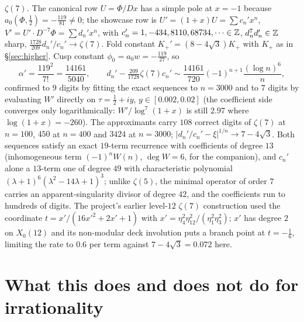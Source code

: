 \documentclass[11pt]{amsart}
\theoremstyle{definition}
\theoremstyle{remark}
\begin{document}
\emph{$\zeta(7)$.} The canonical row $U=\Phi/Dx$ has a simple pole at $x=-1$ because $a_0(\Phi,\tfrac12)=-\tfrac{119}{81}\ne0$; the showcase row is $U'=(1+x)U=\sum c_n'x^n$, $V'=U'\cdot D^{-7}\Phi=\sum d_n'x^n$, with $c_n'=1,-434,8110,68734,\dots\in\mathbb Z$, $d_n^7d_n'\in\mathbb Z$ sharp, $\frac{1728}{209}d_n'/c_n'\to\zeta(7)$. Fold constant $K_+'=(8-4\sqrt3)K_+$ with $K_+$ as in \S\ref{sec:higher}. Cusp constant $\phi_0=a_0w=-\frac{119}{27}$, so
$$\alpha'=\frac{119^2}{7!}=\frac{14161}{5040},\qquad d_n'-\tfrac{209}{1728}\zeta(7)c_n'\sim\frac{14161}{720}(-1)^{n+1}\frac{(\log n)^6}n,$$
confirmed to $9$ digits by fitting the exact sequences to $n=3000$ and to $7$ digits by evaluating $W'$ directly on $\tau=\tfrac12+iy$, $y\in[0.002,0.02]$ (the coefficient side converges only logarithmically: $W'/\log^7(1+x)$ is still $2.97$ where $\log(1+x)=-260$). The approximants carry $108$ correct digits of $\zeta(7)$ at $n=100$, $450$ at $n=400$ and $3424$ at $n=3000$; $|d_n'/c_n'-\xi|^{1/n}\to7-4\sqrt3$. Both sequences satisfy an exact $19$-term recurrence with coefficients of degree $13$ (inhomogeneous term $(-1)^nW(n)$, $\deg W=6$, for the companion), and $c_n'$ alone a $13$-term one of degree $49$ with characteristic polynomial $(\lambda+1)^6(\lambda^2-14\lambda+1)^3$; unlike $\zeta(5)$, the minimal operator of order $7$ carries an apparent-singularity divisor of degree $42$, and the coefficients run to hundreds of digits. The project's earlier level-$12$ $\zeta(7)$ construction used the coordinate $t=x'/(16x'^2+2x'+1)$ with $x'=\eta_4^2\eta_{12}^2/(\eta_1^2\eta_3^2)$; $x'$ has degree $2$ on $X_0(12)$ and its non-modular deck involution puts a branch point at $t=-\tfrac16$, limiting the rate to $0.6$ per term against $7-4\sqrt3=0.072$ here.

\section{What this does and does not do for irrationality}\label{sec:dioph}
\end{document}
